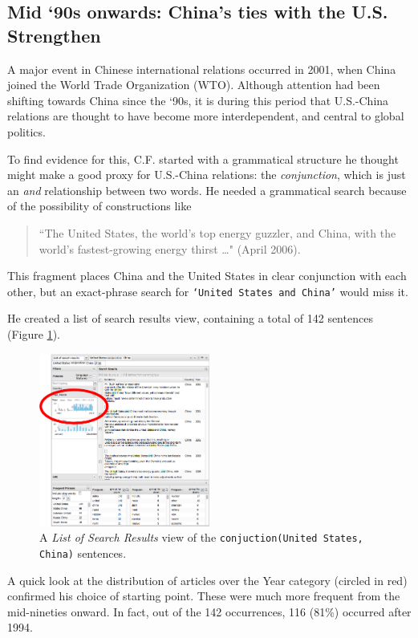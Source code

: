 \documentclass{sig-alternate}
\newcommand{\code}[1] {\texttt{#1}}
\begin{document}
\subsection{Mid `90s onwards: China's ties with the U.S. Strengthen}

A major event in Chinese international relations occurred in 2001, when China joined the World Trade Organization (WTO).  Although attention had been shifting towards China since the `90s, it is during this period that U.S.-China relations are thought to have become more interdependent, and central to global politics. 

To find evidence for this, C.F.  started with a grammatical structure he thought might make a good proxy for U.S.-China relations: the \emph{conjunction}, which is just an \emph{and} relationship between two words.  He needed a grammatical search because of the possibility of constructions like 
\begin{quote}
``The United States, the world's top energy guzzler, and China, with the world's fastest-growing energy thirst \ldots" (April 2006).
\end{quote}
This fragment places China and the United States in clear conjunction with each other, but an exact-phrase search for \code{`United States and China'} would miss it. 

He created a list of search results view, containing a total of 142 sentences (Figure \ref{fig:chris05}).
\begin{figure}[h!]
\includegraphics[width=0.5\textwidth]{fig/chris/05-circled.png}
\caption{ A \emph{List of Search Results} view of the \code{conjuction(United States, China)} sentences. \label{fig:chris05}}
\end{figure}
A quick look at the distribution of articles over the Year category (circled in red) confirmed his choice of starting point. These were much more frequent from the mid-nineties onward. In fact, out of the 142 occurrences, 116 (81\%) occurred after 1994.
\end{document}
